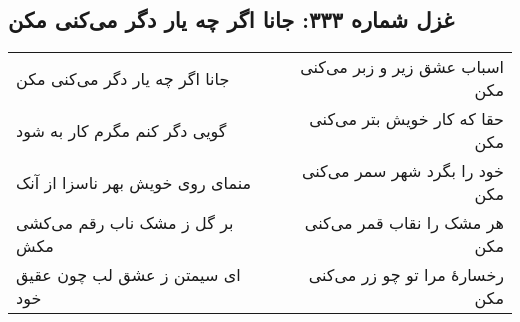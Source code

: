 \begin{center}
\section*{غزل شماره ۳۳۳: جانا اگر چه یار دگر می‌کنی مکن}
\label{sec:333}
\begin{longtable}{l p{0.5cm} r}
جانا اگر چه یار دگر می‌کنی مکن
&&
اسباب عشق زیر و زبر می‌کنی مکن
\\
گویی دگر کنم مگرم کار به شود
&&
حقا که کار خویش بتر می‌کنی مکن
\\
منمای روی خویش بهر ناسزا از آنک
&&
خود را بگرد شهر سمر می‌کنی مکن
\\
بر گل ز مشک ناب رقم می‌کشی مکش
&&
هر مشک را نقاب قمر می‌کنی مکن
\\
ای سیمتن ز عشق لب چون عقیق خود
&&
رخسارهٔ مرا تو چو زر می‌کنی مکن
\\
\end{longtable}
\end{center}
